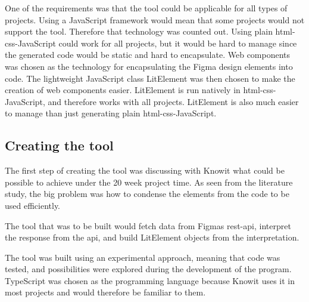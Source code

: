 One of the requirements was that the tool could be applicable for all types of projects. Using a JavaScript framework would mean that some projects would not support the tool. Therefore that technology was counted out. Using plain \acrshort{html}-\acrshort{css}-JavaScript could work for all projects, but it would be hard to manage since the generated code would be static and hard to encapsulate. Web \glspl{component} was chosen as the technology for encapsulating the Figma design elements into code. The lightweight JavaScript class LitElement was then chosen to make the creation of web components easier. LitElement is run natively in \acrshort{html}-\acrshort{css}-JavaScript, and therefore works with all projects. LitElement is also much easier to manage than just generating plain \acrshort{html}-\acrshort{css}-JavaScript.





\subsection{Creating the tool}%
\label{sub:}

The first step of creating the tool was discussing with Knowit what could be possible to achieve under the 20 week project time. As seen from the literature study, the big problem was how to condense the elements from the code to be used efficiently. 

The tool that was to be built would fetch data from Figmas \acrshort{rest}-\acrshort{api}, interpret the response from the \acrshort{api}, and build LitElement objects from the interpretation.

The tool was built using an experimental approach, meaning that code was tested, and possibilities were explored during the development of the program. TypeScript was chosen as the programming language because Knowit uses it in most projects and would therefore be familiar to them.

